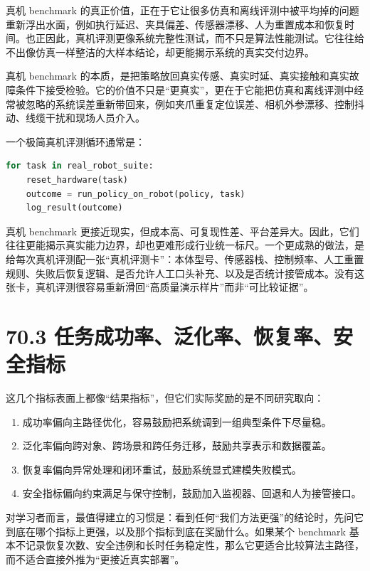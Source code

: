 真机 benchmark 的真正价值，正在于它让很多仿真和离线评测中被平均掉的问题重新浮出水面，例如执行延迟、夹具偏差、传感器漂移、人为重置成本和恢复时间。也正因此，真机评测更像系统完整性测试，而不只是算法性能测试。它往往给不出像仿真一样整洁的大样本结论，却更能揭示系统的真实交付边界。

真机 benchmark 的本质，是把策略放回真实传感、真实时延、真实接触和真实故障条件下接受检验。它的价值不只是“更真实”，更在于它能把仿真和离线评测中经常被忽略的系统误差重新带回来，例如夹爪重复定位误差、相机外参漂移、控制抖动、线缆干扰和现场人员介入。

一个极简真机评测循环通常是：

\begin{lstlisting}[language=python]
for task in real_robot_suite:
    reset_hardware(task)
    outcome = run_policy_on_robot(policy, task)
    log_result(outcome)
\end{lstlisting}

真机 benchmark 更接近现实，但成本高、可复现性差、平台差异大。因此，它们往往更能揭示真实能力边界，却也更难形成行业统一标尺。一个更成熟的做法，是给每次真机评测配一张“真机评测卡”：本体型号、传感器栈、控制频率、人工重置规则、失败后恢复逻辑、是否允许人工口头补充、以及是否统计接管成本。没有这张卡，真机评测很容易重新滑回“高质量演示样片”而非“可比较证据”。

\section*{70.3 任务成功率、泛化率、恢复率、安全指标}


这几个指标表面上都像“结果指标”，但它们实际奖励的是不同研究取向：

\begin{enumerate}
\item 成功率偏向主路径优化，容易鼓励把系统调到一组典型条件下尽量稳。
\item 泛化率偏向跨对象、跨场景和跨任务迁移，鼓励共享表示和数据覆盖。
\item 恢复率偏向异常处理和闭环重试，鼓励系统显式建模失败模式。
\item 安全指标偏向约束满足与保守控制，鼓励加入监视器、回退和人为接管接口。
\end{enumerate}

对学习者而言，最值得建立的习惯是：看到任何“我们方法更强”的结论时，先问它到底在哪个指标上更强，以及那个指标到底在奖励什么。如果某个 benchmark 基本不记录恢复次数、安全违例和长时任务稳定性，那么它更适合比较算法主路径，而不适合直接外推为“更接近真实部署”。

